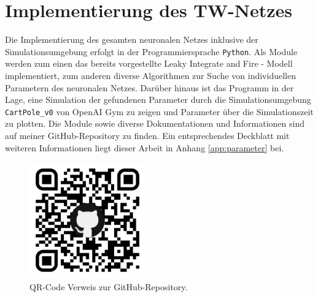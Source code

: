 %
\chapter{Implementierung des TW-Netzes}
\label{chap:imp}
%

	\begin{minipage}[b]{0.65\textwidth}
		Die Implementierung des gesamten neuronalen Netzes inklusive der Simulationsumgebung erfolgt in der Programmiersprache \texttt{Python}. Als Module werden zum einen das bereits vorgestellte Leaky Integrate and Fire - Modell implementiert, zum anderen diverse Algorithmen zur Suche von individuellen Parametern des neuronalen Netzes. Darüber hinaus ist das Programm in der Lage, eine Simulation der gefundenen Parameter durch die Simulationsumgebung \texttt{CartPole\_v0} von OpenAI Gym zu zeigen und Parameter über die Simulationszeit zu plotten. Die Module sowie diverse Dokumentationen und Informationen sind auf meiner GitHub-Repository\footnotemark{} zu finden. Ein entsprechendes Deckblatt mit weiteren Informationen liegt dieser Arbeit in Anhang \ref{app:parameter} bei.
	\end{minipage}
	\begin{minipage}[b]{0.35\textwidth}
		\begin{figure}[H] %
			\centering
			\includegraphics[width=5cm]{figures/appendix/qr-code.pdf}
			\caption{QR-Code Verweis zur GitHub-Repository.}
			\label{fig:qr}
		\end{figure}
	\end{minipage}
		

